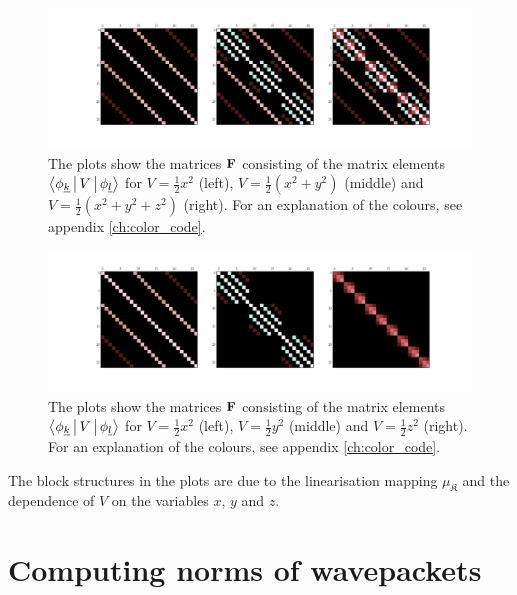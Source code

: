 \begin{figure}
  \centering
  \includegraphics[width=\linewidth]{./fig/matrix_elements_1.png}
  \caption[Matrix elements example 1]{
  The plots show the matrices $\mat{F}$ consisting of the matrix elements $\Braket{\phi_{\vec{k}} | V | \phi_{\vec{l}}}$
  for $V = \frac{1}{2} x^2$ (left), $V = \frac{1}{2} \left(x^2 + y^2\right)$ (middle)
  and $V = \frac{1}{2} \left(x^2 + y^2 + z^2\right)$ (right). For an explanation of the colours, see appendix \ref{ch:color_code}.}
  \label{fig:matrix_elements_example1}
\end{figure}


\begin{figure}
  \centering
  \includegraphics[width=\linewidth]{./fig/matrix_elements_2.png}
  \caption[Matrix elements example 2]{
  The plots show the matrices $\mat{F}$ consisting of the matrix elements $\Braket{\phi_{\vec{k}} | V | \phi_{\vec{l}}}$
  for $V = \frac{1}{2} x^2$ (left), $V = \frac{1}{2} y^2$ (middle)
  and $V = \frac{1}{2} z^2$ (right). For an explanation of the colours, see appendix \ref{ch:color_code}.}
  \label{fig:matrix_elements_example2}
\end{figure}

The block structures in the plots are due to the linearisation mapping $\mu_{\mathfrak{K}}$
and the dependence of $V$ on the variables $x$, $y$ and $z$.


\section{Computing norms of wavepackets}


